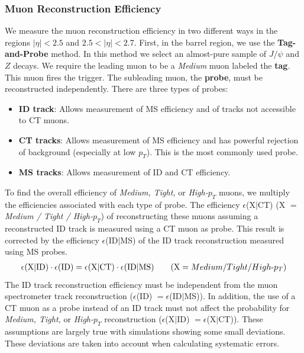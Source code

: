 \subsubsection{Muon Reconstruction Efficiency}\label{sec:efficiency} 
We measure the muon reconstruction efficiency in two different ways in the regions $|\eta|  < 2.5$ and $2.5 < |\eta|  < 2.7$. First, in the barrel region, we use the \textbf{Tag-and-Probe} method. In this method we select an almost-pure sample of $J/\psi$ and $Z$ decays. We require the leading muon to be a \textit{Medium} muon labeled the \textbf{tag}. This muon fires the trigger. The subleading muon, the \textbf{probe}, must be reconstructed independently. There are three types of probes:
\begin{itemize}
\item \textbf{ID track}: Allows measurement of MS efficiency and of tracks not accessible to CT muons. 
\item \textbf{CT tracks}: Allows measurement of MS efficiency and has powerful rejection of background (especially at low $p_T$). This is the most commonly used probe. 
\item \textbf{MS tracks}: Allows measurement of ID and CT efficiency.
\end{itemize}
\par \hspace{20pt} To find the overall efficiency of \textit{Medium, Tight,} or \textit{High-$p_T$} muons, we multiply the efficiencies associated with each type of probe. The efficiency  $\epsilon$(X$|$CT) (X $=$ \textit{Medium / Tight / High-$p_T$}) of reconstructing these muons assuming a reconstructed ID track is measured using a CT muon as probe. This result is corrected by the efficiency $\epsilon$(ID$|$MS) of the ID track reconstruction measured using MS probes.
\begin{align*}
	\centering 
    \epsilon \textrm{(X$|$ID)} \cdot \epsilon \textrm{(ID)} = \epsilon \textrm{(X$|$CT)} \cdot \epsilon \textrm{(ID$|$MS)} \hspace{20 pt} (\textrm{X} = Medium/Tight/High\textrm{-}p_T)
\end{align*}
The ID track reconstruction efficiency must be independent from the muon spectrometer track reconstruction ($\epsilon$(ID) $= \epsilon$(ID$|$MS)). In addition, the use of a CT muon as a probe instead of an ID track must not affect the probability for \textit{Medium, Tight,} or \textit{High-$p_T$} reconstruction ($\epsilon$(X$|$ID) $= \epsilon$(X$|$CT)). These assumptions are largely true with simulations showing some small deviations. These deviations are taken into account when calculating systematic errors. 

